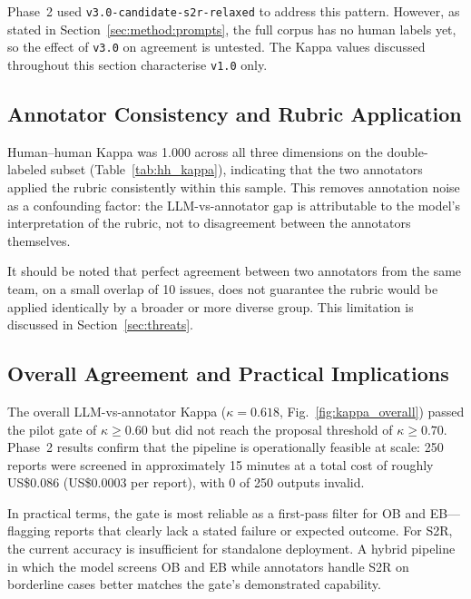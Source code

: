 Phase~2 used \texttt{v3.0-candidate-s2r-relaxed} to address this
pattern.  However, as stated in Section~\ref{sec:method:prompts}, the
full corpus has no human labels yet, so the effect of \texttt{v3.0} on
agreement is untested.  The Kappa values discussed throughout this
section characterise \texttt{v1.0} only.

\subsection{Annotator Consistency and Rubric Application}

Human--human Kappa was 1.000 across all three dimensions on the
double-labeled subset (Table~\ref{tab:hh_kappa}), indicating that the
two annotators applied the rubric consistently within this sample.
This removes annotation noise as a confounding factor: the
LLM-vs-annotator gap is attributable to the model's interpretation of
the rubric, not to disagreement between the annotators themselves.

It should be noted that perfect agreement between two annotators from
the same team, on a small overlap of 10 issues, does not guarantee the
rubric would be applied identically by a broader or more diverse group.
This limitation is discussed in Section~\ref{sec:threats}.

\subsection{Overall Agreement and Practical Implications}

The overall LLM-vs-annotator Kappa ($\kappa = 0.618$,
Fig.~\ref{fig:kappa_overall}) passed the pilot gate of $\kappa \geq
0.60$ but did not reach the proposal threshold of $\kappa \geq 0.70$.
Phase~2 results confirm that the pipeline is operationally feasible at
scale: 250 reports were screened in approximately 15 minutes at a
total cost of roughly US\$0.086 (US\$0.0003 per report), with 0 of
250 outputs invalid.

In practical terms, the gate is most reliable as a first-pass filter
for OB and EB---flagging reports that clearly lack a stated failure or
expected outcome.  For S2R, the current accuracy is insufficient for
standalone deployment.  A hybrid pipeline in which the model screens
OB and EB while annotators handle S2R on borderline cases better
matches the gate's demonstrated capability.
